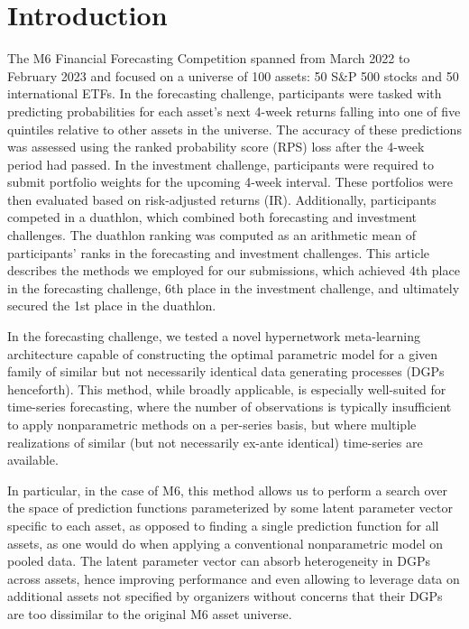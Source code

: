 \documentclass[3p,times,twocolumn]{elsarticle}
\begin{document}
\section{Introduction}

The M6 Financial Forecasting Competition \citep[see][]{makridakisM6FinancialDuathlon2022} spanned from March 2022 to February 2023 and focused on a universe of 100 assets: 50 S\&P 500 stocks and 50 international ETFs.
In the forecasting challenge, participants were tasked with predicting probabilities for each asset's next 4-week returns falling into one of five quintiles relative to other assets in the universe. 
The accuracy of these predictions was assessed using the ranked probability score (RPS) loss after the 4-week period had passed.
In the investment challenge, participants were required to submit portfolio weights for the upcoming 4-week interval. 
These portfolios were then evaluated based on risk-adjusted returns (IR).
Additionally, participants competed in a duathlon, which combined both forecasting and investment challenges. 
The duathlon ranking was computed as an arithmetic mean of participants' ranks in the forecasting and investment challenges.
This article describes the methods we employed for our submissions, which achieved 4th place in the forecasting challenge, 6th place in the investment challenge, and ultimately secured the 1st place in the duathlon.

In the forecasting challenge, we tested a novel hypernetwork meta-learning architecture capable of constructing the optimal parametric model for a given family of similar but not necessarily identical data generating processes (DGPs henceforth). 
This method, while broadly applicable, is especially well-suited for time-series forecasting, where the number of observations is typically insufficient to apply nonparametric methods on a per-series basis, but where multiple realizations of similar (but not necessarily ex-ante identical) time-series are available.

In particular, in the case of M6, this method allows us to perform a search over the space of prediction functions parameterized by some latent parameter vector specific to each asset, as opposed to finding a single prediction function for all assets, as one would do when applying a conventional nonparametric model on pooled data.
The latent parameter vector can absorb heterogeneity in DGPs across assets, hence improving performance and even allowing to leverage data on additional assets not specified by organizers without concerns that their DGPs are too dissimilar to the original M6 asset universe.
\end{document}
